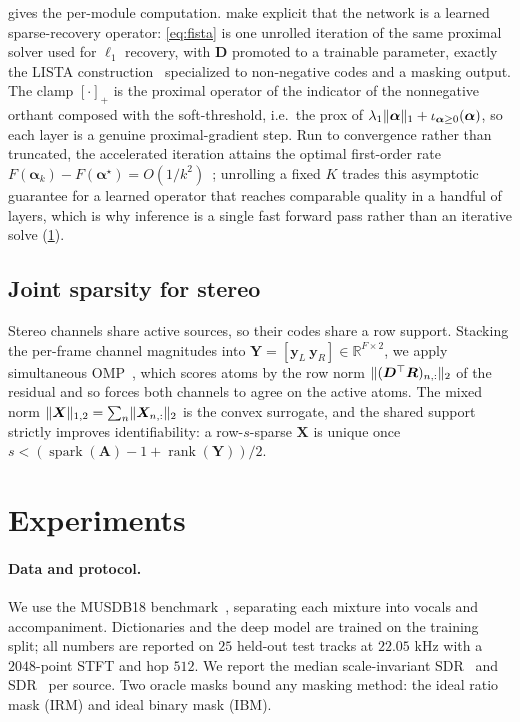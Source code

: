 \documentclass{article}
\DeclarePairedDelimiter{\norm}{\lVert}{\rVert}
\DeclareMathOperator{\rank}{rank}
\DeclareMathOperator{\spark}{spark}
\newcommand{\R}{\mathbb{R}}
\newcommand{\D}{\bm{D}}
\newcommand{\Y}{\bm{Y}}
\newcommand{\X}{\bm{X}}
\newcommand{\A}{\bm{A}}
\newcommand{\yv}{\bm{y}}
\newcommand{\av}{\bm{\alpha}}
\begin{document}
 gives the per-module computation. 
make explicit that the network is a learned
sparse-recovery operator: \cref{eq:fista} is one unrolled iteration of the same
proximal solver used for $\ell_1$ recovery, with $\D$ promoted to a trainable
parameter, exactly the LISTA construction~\cite{gregor2010lista} specialized to
non-negative codes and a masking output. The clamp $[\cdot]_+$ is the proximal
operator of the indicator of the nonnegative orthant composed with the
soft-threshold, i.e.\ the prox of $\lambda_1\norm{\av}_1+\iota_{\av\ge0}(\av)$, so
each layer is a genuine proximal-gradient step. Run to convergence rather than
truncated, the accelerated iteration attains the optimal first-order rate
$F(\av_k)-F(\av^\star)=O(1/k^2)$~\cite{beck2009fista}; unrolling a fixed $K$ trades
this asymptotic guarantee for a learned operator that reaches comparable quality in
a handful of layers, which is why inference is a single fast forward pass rather
than an iterative solve (\cref{sec:exp}).

\subsection{Joint sparsity for stereo}
\label{sec:mmv}
Stereo channels share active sources, so their codes share a row support. Stacking
the per-frame channel magnitudes into $\Y=[\yv_L\ \yv_R]\in\R^{F\times2}$, we apply
simultaneous OMP~\cite{tropp2006somp}, which scores atoms by the row norm
$\norm{(\D^\top\bm R)_{n,:}}_2$ of the residual and so forces both channels to agree
on the active atoms. The mixed norm $\norm{\X}_{1,2}=\sum_n\norm{\X_{n,:}}_2$ is the
convex surrogate, and the shared support strictly improves identifiability: a
row-$s$-sparse $\X$ is unique once
$s<(\spark(\A)-1+\rank(\Y))/2$.

\section{Experiments}
\label{sec:exp}
\paragraph{Data and protocol.}
We use the MUSDB18 benchmark~\cite{rafii2017musdb18}, separating each mixture into
vocals and accompaniment. Dictionaries and the deep model are trained on the
training split; all numbers are reported on $25$ held-out test tracks at
$22.05$ kHz with a $2048$-point STFT and hop $512$. We report the median
scale-invariant SDR~\cite{leroux2019sdr} and SDR~\cite{vincent2006bsseval} per
source. Two oracle masks bound any masking method: the ideal ratio mask (IRM) and
ideal binary mask (IBM).
\end{document}

